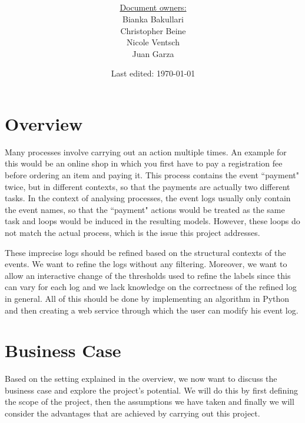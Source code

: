 \documentclass[notitlepage]{article}
\title{%
	\documentName\text{ } \\
  \large \projectName\text{ } \\
  }
\author{
	\large \underline{Document owners:}\\ 
	Bianka Bakullari\\
	\texttt{}
	Christopher Beine\\
	\texttt{}
	Nicole Ventsch\\
	\texttt{}
	Juan Garza\\
	\texttt{}
}
\date{\small{Last edited: \today}}
\begin{document}
\begin{titlepage}
\clearpage\maketitle			%
\thispagestyle{fancy}
\tableofcontents
\end{titlepage}

\rfoot{\thepage}				%


\begin{flushleft}				%

\section{Overview}
Many processes involve carrying out an action multiple times. An example for this would be an online shop in which you first have to pay a registration fee before ordering an item and paying it. This process contains the event ``payment" twice, but in different contexts, so that the payments are actually two different tasks. In the context of analysing processes, the event logs usually only contain the event names, so that the ``payment" actions would be treated as the same task and loops would be induced in the resulting models. However, these loops do not match the actual process, which is the issue this project addresses. 

These imprecise logs should be refined based on the structural contexts of the events. We want to refine the logs without any filtering. Moreover, we want to allow an interactive change of the thresholds used to refine the labels since this can vary for each log and we lack knowledge on the correctness of the refined log in general. All of this should be done by implementing an algorithm in Python and then creating a web service through which the user can modify his event log.




\section{Business Case}

Based on the setting explained in the overview, we now want to discuss the business case and explore the project's potential. We will do this by first defining the scope of the project, then the assumptions we have taken and finally we will consider the advantages that are achieved by carrying out this project. 


\end{flushleft}
\end{document}
